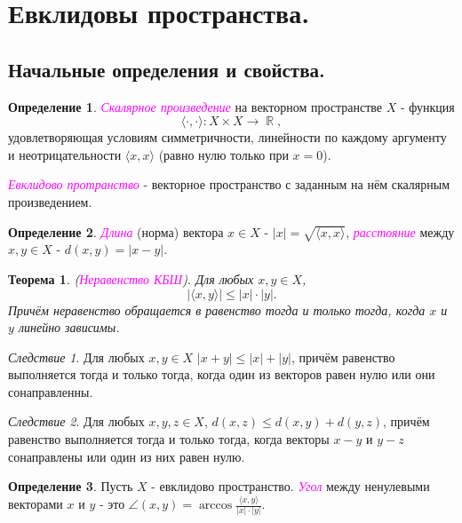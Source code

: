 \documentclass[a4paper,100pt]{article}
\theoremstyle{indented}
\newtheorem{theorem}{Теорема}
\theoremstyle{definition}
\newtheorem{defn}{Определение}
\theoremstyle{remark}
\newtheorem{cons}{Следствие}
\DeclareMathOperator{\ra}{\rightarrow}
\DeclareMathOperator{\RR}{\mathbb{R}}
\begin{document}
\section{Евклидовы пространства.}

\subsection{Начальные определения и свойства.} 

\begin{defn}
    \textit{\textcolor{magenta}{\hypertarget{s53}{Скалярное произведение}}} на векторном пространстве $X$ - функция 
    \[
        \langle \cdot, \cdot \rangle: X\times X \ra \RR, 
    \]
    удовлетворяющая условиям симметричности, линейности по каждому аргументу и неотрицательности $\langle x, x \rangle$ (равно нулю только при $x=0$). \ 

    \textit{\textcolor{magenta}{\hypertarget{s54}{Евклидово протранство}}} - векторное пространство с заданным на нём скалярным произведением.
\end{defn}

\begin{defn}
    \textit{\textcolor{magenta}{\hypertarget{s55}{Длина}}} (норма) вектора $x \in X$ - $|x|=\sqrt{\langle x, x \rangle}$, \textit{\textcolor{magenta}{\hypertarget{s56}{расстояние}}} между $x, y\in X$ - $d(x, y)=|x-y|$.
\end{defn}

\begin{theorem}
    (\textit{\textcolor{magenta}{\hypertarget{s57}{Неравенство КБШ}}}). Для любых $x, y \in X$, 
    \[
        |\langle x, y \rangle|\leq |x|\cdot|y|. 
    \]
    Причём неравенство обращается в равенство тогда и только тогда, когда $x$ и $y$ линейно зависимы.
\end{theorem}

\begin{cons}
    Для любых $x, y\in X$ $|x+y|\leq |x|+|y|$, причём равенство выполняется тогда и только тогда, когда один из векторов равен нулю или они сонаправленны.
\end{cons}

\begin{cons}
    Для любых $x, y, z\in X$, $d(x, z)\leq d(x, y)+d(y, z)$, причём равенство выполняется тогда и только тогда, когда векторы $x-y$ и $y-z$ сонаправлены или один из них равен нулю.
\end{cons}

\begin{defn}
    Пусть $X$ - евклидово пространство. \textit{\textcolor{magenta}{\hypertarget{s58}{Угол}}} между ненулевыми векторами $x$ и $y$ - это $\angle (x, y) = \arccos \frac{\langle x, y \rangle}{|x|\cdot |y|}$.
\end{defn}
\end{document}
